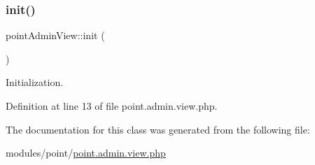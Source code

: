 \subsubsection{\texorpdfstring{init()}{init()}}
{\footnotesize\ttfamily point\+Admin\+View\+::init (\begin{DoxyParamCaption}{ }\end{DoxyParamCaption})}



Initialization. 



Definition at line 13 of file point.\+admin.\+view.\+php.



The documentation for this class was generated from the following file\+:\begin{DoxyCompactItemize}
\item 
modules/point/\hyperlink{point_8admin_8view_8php}{point.\+admin.\+view.\+php}\end{DoxyCompactItemize}
